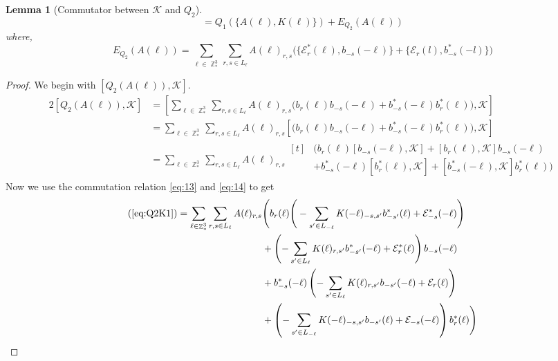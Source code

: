 \documentclass[sn-mathphys,Numbered, a4paper ,nocrop]{sn-jnl}%
\DeclareMathOperator{\Z}{\mathbb{Z}}
\theoremstyle{plain}
\newtheorem{lemma}[theorem]{Lemma}
\theoremstyle{definition}
\theoremstyle{remark}
\theoremstyle{plain}
\theoremstyle{definition}
\theoremstyle{remark}
\begin{document}
\begin{lemma}[Commutator between $\mathcal{K} $ and $Q_2$]
\begin{equation}
    [ Q_2(A(\ell)),\mathcal{K}] = Q_1(\{A(\ell),K(\ell)\}) + E_{Q_2}(A(\ell))
\end{equation}
 where,
\begin{equation}
     E_{Q_2}(A(\ell))=\sum\limits_{\ell \in \Z^3_*}\sum\limits_{r,s \in L_{\ell}}A(\ell)_{r,s}\Big(\big\{\mathcal{E}^*_{r}(\ell), b_{-s}(-\ell)\big\} + \big\{\mathcal{E}_r(l), b^*_{-s}(-l)\big\}\Big)
\end{equation}
\end{lemma}
\begin{proof}
We begin with $[ Q_2(A(\ell)),\mathcal{K}]$.
\begin{alignat}{2}
    [Q_2(A(\ell)),\mathcal{K}] &= \left[\sum\limits_{\ell \in \Z^3_*}\sum\limits_{r,s \in L_{\ell}}A(\ell)_{r,s}\Big(b_{r}(\ell)b_{-s}(-\ell) + b^*_{-s}(-\ell)b^*_{r}(\ell)\Big),\mathcal{K}\right]\\
    &= \sum\limits_{\ell \in \Z^3_*}\sum\limits_{r,s \in L_{\ell}}A(\ell)_{r,s}\left[\Big(b_{r}(\ell)b_{-s}(-\ell) + b^*_{-s}(-\ell)b^*_{r}(\ell)\Big),\mathcal{K}\right]\\
    &= \sum\limits_{\ell \in \Z^3_*}\sum\limits_{r,s \in L_{\ell}}A(\ell)_{r,s}\begin{aligned}[t]
        &\Big(b_{r}(\ell)[b_{-s}(-\ell),\mathcal{K}] + [b_{r}(\ell),\mathcal{K}]b_{-s}(-\ell)\\&+ b^*_{-s}(-\ell)[b^*_{r}(\ell),\mathcal{K}] + [b^*_{-s}(-\ell),\mathcal{K}]b^*_{r}(\ell) \Big)
    \end{aligned}\label{eq:Q2K1}
\end{alignat}
Now we use the commutation relation \eqref{eq:13} and \eqref{eq:14} to get
\begin{equation}
    (\ref{eq:Q2K1})=\sum\limits_{\ell \in \Z^3_*}\sum\limits_{r,s \in L_{\ell}}A(\ell)_{r,s}\begin{aligned}[t]
        &\Bigg(b_{r}(\ell)\Bigg(-\sum\limits_{s'\in L_{-\ell}}K(-\ell)_{-s,s'}b^*_{-s'}(\ell) + \mathcal{E}^*_{-s}(-\ell)\Bigg)\\ &+ \left(-\sum\limits_{s'\in L_{\ell}}K(\ell)_{r,s'}b^*_{-s'}(-\ell) + \mathcal{E}^*_{r}(\ell)\right)b_{-s}(-\ell)\\&+ b^*_{-s}(-\ell)\left(-\sum\limits_{s'\in L_{\ell}}K(\ell)_{r,s'}b_{-s'}(-\ell) + \mathcal{E}_{r}(\ell)\right)\\ &+ \left(-\sum\limits_{s'\in L_{-\ell}}K(-\ell)_{-s,s'}b_{-s'}(\ell) + \mathcal{E}_{-s}(-\ell)\right)b^*_{r}(\ell) \Bigg)

\end{aligned}
\end{equation}
\end{proof}
\end{document}
